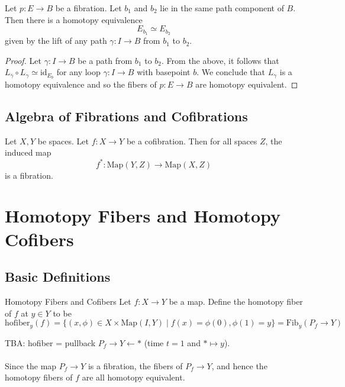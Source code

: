 \documentclass[a4paper]{article}
\begin{document}
\begin{thm}{}{} Let $p:E\to B$ be a fibration. Let $b_1$ and $b_2$ lie in the same path component of $B$. Then there is a homotopy equivalence $$E_{b_1}\simeq E_{b_2}$$ given by the lift of any path $\gamma:I\to B$ from $b_1$ to $b_2$. \tcbline
\begin{proof}
Let $\gamma:I\to B$ be a path from $b_1$ to $b_2$. From the above, it follows that $L_{\overline{\gamma}}\circ L_\gamma\simeq\text{id}_{E_b}$ for any loop $\gamma:I\to B$ with basepoint $b$. We conclude that $L_\gamma$ is a homotopy equivalence and so the fibers of $p:E\to B$ are homotopy equivalent. 
\end{proof}
\end{thm}

\subsection{Algebra of Fibrations and Cofibrations}
\begin{prp}{}{} Let $X,Y$ be spaces. Let $f:X\to Y$ be a cofibration. Then for all spaces $Z$, the induced map $$f^\ast:\text{Map}(Y,Z)\to\text{Map}(X,Z)$$ is a fibration. 
\end{prp}

\pagebreak
\section{Homotopy Fibers and Homotopy Cofibers}
\subsection{Basic Definitions}
\begin{defn}{Homotopy Fibers and Cofibers}{} Let $f:X\to Y$ be a map. Define the homotopy fiber of $f$ at $y\in Y$ to be $$\text{hofiber}_y(f)=\{(x,\phi)\in X\times\text{Map}(I,Y)\;|\;f(x)=\phi(0), \phi(1)=y\}=\text{Fib}_y(P_f\to Y)$$
\end{defn}

TBA: hofiber = pullback $P_f\to Y\leftarrow\ast$ (time $t=1$ and $\ast\mapsto y$). \\~\\

Since the map $P_f\to Y$ is a fibration, the fibers of $P_f\to Y$, and hence the homotopy fibers of $f$ are all homotopy equivalent. 
\end{document}
